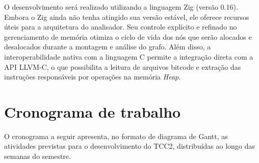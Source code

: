 \documentclass[
    12pt,                %
    openright,           %
    oneside,             %
    a4paper,             %
    english,             %
    brazil               %
]{abntex2}
\begin{document}
\par
O desenvolvimento será realizado utilizando a linguagem Zig (versão 0.16). Embora o Zig ainda não tenha atingido sua versão estável, ele oferece recursos úteis para a arquitetura do analisador. Seu controle explícito e refinado no gerenciamento de memória otimiza o ciclo de vida dos nós que serão alocados e desalocados durante a montagem e análise do grafo. Além disso, a interoperabilidade nativa com a linguagem C permite a integração direta com a API LLVM-C, 
o que possibilita a leitura de arquivos bitcode e extração das instruções responsáveis por operações na memória \textit{Heap}.

\section{Cronograma de trabalho}
\label{sec:cronograma}

O cronograma a seguir apresenta, no formato de diagrama de Gantt, as atividades previstas para o desenvolvimento do TCC2, distribuídas ao longo das semanas do semestre.
\end{document}
